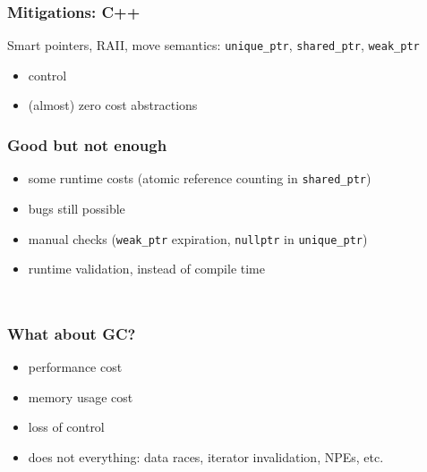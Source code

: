 \documentclass{beamer}
\begin{document}
\begin{frame}
    \begin{multicols}{2}
        \inputminted[fontsize=\tiny]{c}{code/vec_no_comment.c}
    \end{multicols}
\end{frame}

\begin{frame}
    \begin{multicols}{2}
        \inputminted[fontsize=\tiny]{c}{code/vec.c}
    \end{multicols}
\end{frame}

\begin{frame}
    \frametitle{Mitigations: C++}
    Smart pointers, RAII, move semantics: \texttt{unique\_ptr},
    \texttt{shared\_ptr}, \texttt{weak\_ptr}

    \begin{itemize}
        \item control
        \item (almost) zero cost abstractions
    \end{itemize}
\end{frame}

\begin{frame}
    \frametitle{Good but not enough}
    \begin{itemize}
        \item some runtime costs (atomic reference counting in \texttt{shared\_ptr})
        \item bugs still possible
        \item manual checks (\texttt{weak\_ptr} expiration, \texttt{nullptr} in \texttt{unique\_ptr})
        \item runtime validation, instead of compile time
    \end{itemize}
\end{frame}

\begin{frame}
    \inputminted{c++}{code/bad_move.cpp}
\end{frame}

\begin{frame}
    \inputminted{c++}{code/invalid_ref.cpp}
\end{frame}


\begin{frame}
    \frametitle{What about GC?}
    \begin{itemize}
        \item performance cost
        \item memory usage cost
        \item loss of control
        \item does not everything: data races, iterator invalidation, NPEs, etc.
    \end{itemize}
\end{frame}
\end{document}
